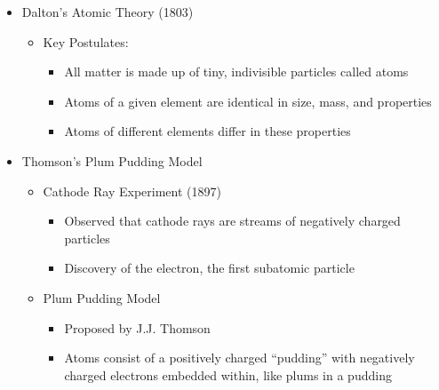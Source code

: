 \begin{itemize}

  \item Dalton's Atomic Theory (1803)

    \begin{itemize}

      \item Key Postulates:

        \begin{itemize}

          \item All matter is made up of tiny, indivisible particles called atoms

          \item Atoms of a given element are identical in size, mass, and properties

          \item Atoms of different elements differ in these properties

        \end{itemize}

    \end{itemize}

  \item Thomson's Plum Pudding Model

    \begin{itemize}

      \item Cathode Ray Experiment (1897)

        \begin{itemize}

          \item Observed that cathode rays are streams of negatively charged particles

          \item Discovery of the electron, the first subatomic particle

        \end{itemize}

      \item Plum Pudding Model

        \begin{itemize}

          \item Proposed by J.J. Thomson

          \item Atoms consist of a positively charged ``pudding'' with negatively charged electrons embedded within, like plums in a pudding


\end{itemize}
\end{itemize}
\end{itemize}

